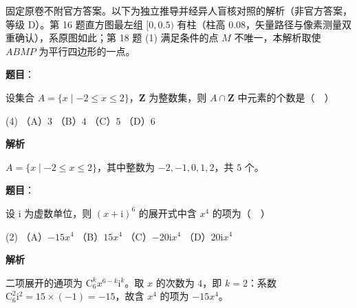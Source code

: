 

\begin{gktip}
固定原卷不附官方答案。以下为独立推导并经异人盲核对照的解析（非官方答案，等级 D）。第 16 题直方图最左组 \([0,0.5)\) 有柱（柱高 \(0.08\)，矢量路径与像素测量双重确认），系原图如此；第 18 题 (1) 满足条件的点 \(M\) 不唯一，本解析取使 \(ABMP\) 为平行四边形的一点。
\end{gktip}

\begin{answer}

\textbf{题目}：

设集合 \(A=\{x\mid -2\leqslant x\leqslant 2\}\)，\(\mathbf{Z}\) 为整数集，则 \(A\cap\mathbf{Z}\) 中元素的个数是（　）

\begin{gkopts}(4)
\task （A）\(3\)
\task （B）\(4\)
\task （C）\(5\)
\task （D）\(6\)
\end{gkopts}

\textbf{解析}

\(A=\{x\mid -2\leqslant x\leqslant 2\}\)，其中整数为 \(-2,-1,0,1,2\)，共 \(5\) 个。


\end{answer}
\begin{answer}

\textbf{题目}：

设 \(\mathrm{i}\) 为虚数单位，则 \((x+\mathrm{i})^{6}\) 的展开式中含 \(x^{4}\) 的项为（　）

\begin{gkopts}(2)
\task （A）\(-15x^{4}\)
\task （B）\(15x^{4}\)
\task （C）\(-20\mathrm{i}x^{4}\)
\task （D）\(20\mathrm{i}x^{4}\)
\end{gkopts}

\textbf{解析}

二项展开的通项为 \(\mathrm C_6^k x^{6-k}\mathrm i^{k}\)。取 \(x\) 的次数为 \(4\)，即 \(k=2\)：系数 \(\mathrm C_6^2\mathrm i^{2}=15\times(-1)=-15\)，故含 \(x^{4}\) 的项为 \(-15x^{4}\)。


\end{answer}
